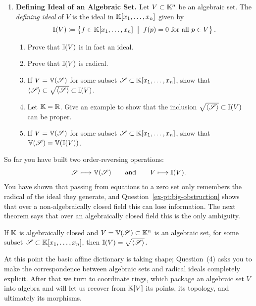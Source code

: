 \documentclass[12pt,reqno]{amsart}
\begin{document}
\begin{enumerate}[leftmargin=*]
 \item \textbf{Defining Ideal of an Algebraic Set.} Let $V \subset \mathbb{K}^n$ be an algebraic set. The \emph{defining ideal} of $V$ is the ideal in $\mathbb{K}[x_1,\ldots,x_n]$ given by 
 \[
 \mathbb{I}(V) \coloneqq \left\{ f \in \mathbb{K}[x_1,\ldots,x_n] \;\; \big| \;\; f(p) = 0 \text{ for all $p \in V$} \right\}.
 \]
 \begin{enumerate}[label=(\alph*),ref=\theenumi\alph*]
 	\item Prove that $\mathbb{I}(V)$ is in fact an ideal. 
	\item Prove that $\mathbb{I}(V)$ is radical. 
	\item If $V = \mathbb{V}(\mathcal{S})$ for some subset $\mathcal{S} \subset \mathbb{K}[x_1,\ldots,x_n]$, show that $\langle \mathcal{S} \rangle \subset \sqrt{\langle \mathcal{S} \rangle} \subset \mathbb{I}(V)$. 
	\item\label{ex-pt:big-obstruction} Let $\mathbb{K}=\mathbb{R}$. Give an example to show that the inclusion $\sqrt{\langle \mathcal{S} \rangle } \subset \mathbb{I}(V)$ can be proper. 
	\item If $V = \mathbb{V}(\mathcal{S})$ for some subset $\mathcal{S} \subset \mathbb{K}[x_1,\ldots,x_n]$, show that $\mathbb{V}(\mathcal{S}) = \mathbb{V}(\mathbb{I}(V))$. 
 \end{enumerate}
 \end{enumerate}
 
 \hrulefill
 
So far you have built two order-reversing operations:
\[
\mathcal{S} \longmapsto \mathbb{V}(\mathcal{S})
\qquad\text{and}\qquad
V \longmapsto \mathbb{I}(V).
\]
You have shown that passing from equations to a zero set only remembers the radical of the ideal they generate, and Question~\ref{ex-pt:big-obstruction} shows that over a non-algebraically closed field this can lose information. The next theorem says that over an algebraically closed field this is the only ambiguity.
 
 \begin{theorem} If $\mathbb{K}$ is algebraically closed and $V = \mathbb{V}(\mathcal{S}) \subset \mathbb{K}^n$ is an algebraic set, for some subset $\mathcal{S} \subset \mathbb{K}[x_1,\ldots,x_n]$, then $\mathbb{I}(V) = \sqrt{\langle \mathcal{S} \rangle}$. 
\end{theorem}  

At this point the basic affine dictionary is taking shape; Question~(4) asks you to make the correspondence between algebraic sets and radical ideals completely explicit. After that we turn to coordinate rings, which package an algebraic set $V$ into algebra and will let us recover from $\mathbb{K}[V]$ its points, its topology, and ultimately its morphisms.
\end{document}
